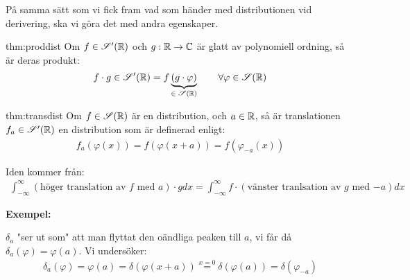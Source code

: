 \par\bigskip
\noindent På samma sätt som vi fick fram vad som händer med distributionen vid derivering, ska vi göra det med andra egenskaper. 
\par\bigskip
\begin{theo}{thm:proddist}
  Om $f\in\mathscr{S}^{\prime}(\mathbb{R})$ och $g:\mathbb{R}\to\mathbb{C}$ är glatt av polynomiell ordning, så är deras produkt:
  \begin{equation*}
    \begin{gathered}
      f\cdot g\in\mathscr{S}^{\prime}(\mathbb{R}) = f\underbrace{(g\cdot\varphi)}_{\text{$\in\mathscr{S}(\mathbb{R})$}}\qquad\forall\varphi\in\mathscr{S}(\mathbb{R})
    \end{gathered}
  \end{equation*}
\end{theo}
\par\bigskip
\begin{theo}{thm:transdist}
  Om $f\in\mathscr{S}(\mathbb{R})$ är en distribution, och $a\in\mathbb{R}$, så är translationen $f_a\in\mathscr{S}^{\prime}(\mathbb{R})$ en distribution som är definerad enligt:
  \begin{equation*}
    \begin{gathered}
      f_a(\varphi(x)) = f(\varphi(x+a)) = f(\varphi_{-a}(x))
    \end{gathered}
  \end{equation*}
  \par\bigskip
  \noindent Iden kommer från:
  \begin{equation*}
    \begin{gathered}
      \int_{-\infty}^{\infty}\left(\text{höger translation av $f$ med $a$}\right)\cdot gdx= \int_{-\infty}^{\infty}f\cdot\left(\text{vänster tranlsation av $g$ med $-a$}\right)dx
    \end{gathered}
  \end{equation*}
\end{theo}
\par\bigskip
\noindent\textbf{Exempel:}\par
\noindent $\delta_a$ "ser ut som" att man flyttat den oändliga peaken till $a$, vi får då $\delta_a(\varphi) = \varphi(a)$. Vi undersöker:
\begin{equation*}
  \begin{gathered}
    \delta_a(\varphi) = \varphi(a) = \delta(\varphi(x+a)) \stackrel{x=0}{=}\delta(\varphi(a)) = \delta(\varphi_{-a})
  \end{gathered}
\end{equation*}
